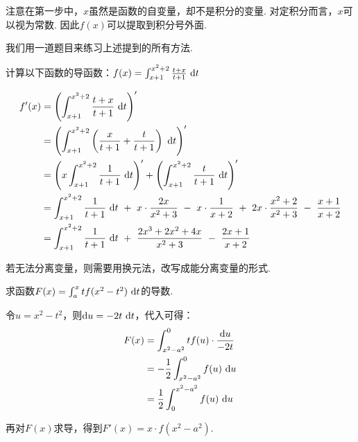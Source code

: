 注意在第一步中，$x$虽然是函数的自变量，却不是积分的变量. 对定积分而言，$x$可以视为常数. 因此$f(x)$可以提取到积分号外面.\par
我们用一道题目来练习上述提到的所有方法.

\begin{example}
\label{ex:ch02-13}
计算以下函数的导函数：$f(x) = \int_{x+1}^{x^2+2} \frac{t+x}{t+1} ~\mathrm{d} t$
\end{example}

\begin{solution}
\begin{equation}
    \begin{aligned}
        f'(x)
        &= \left( \int_{x+1}^{x^2+2} \frac{t+x}{t+1} ~\mathrm{d} t  \right)' \\
        &= \left( \int_{x+1}^{x^2+2} \left(\frac{x}{t+1} + \frac{t}{t+1} \right) ~\mathrm{d} t  \right)' \\
        &= \left( x\int_{x+1}^{x^2+2} \frac{1}{t+1} ~\mathrm{d} t \right)' +\left( \int_{x+1}^{x^2+2}  \frac{t}{t+1} ~\mathrm{d} t \right)  ' \\
        &= \int_{x+1}^{x^2+2} \frac{1}{t+1} ~\mathrm{d} t~ +~ x\cdot \frac{2x}{x^2+3}~-~x\cdot \frac{1}{x+2}
        ~+~2x\cdot \frac{x^2+2}{x^2+3} ~-~ \frac{x+1}{x+2} \\
        &= \int_{x+1}^{x^2+2} \frac{1}{t+1} ~\mathrm{d} t~ +~ \frac{2x^3+2x^2+4x}{x^2+3}~-~\frac{2x+1}{x+2}
        ~~~~~~~~~~~~~~~~~
        \nonumber
    \end{aligned}
\end{equation}
\end{solution}

若无法分离变量，则需要用换元法，改写成能分离变量的形式.

\begin{example}
\label{ex:ch02-14}
求函数$F(x)=\int_{a}^{x} tf(x^2-t^2)~\mathrm{d} t$的导数.
\end{example}

\begin{solution}
令$u= x^2-t^2$，则$\mathrm{d} u=-2t~\mathrm{d} t$，代入可得：
\begin{equation}
    \begin{aligned}
        F(x)
        &= \int_{x^2-a^2}^{0} tf(u)\cdot \frac{\mathrm{d} u}{-2t} \\
        &= -\frac{1}{2}\int_{x^2-a^2}^{0} f(u)~\mathrm{d} u \\
        &= \frac{1}{2}\int_{0}^{x^2-a^2} f(u)~\mathrm{d} u
        \nonumber
    \end{aligned}
\end{equation}\par
再对$F(x)$求导，得到$F'(x) = x\cdot f(x^2-a^2)$.
\end{solution}

